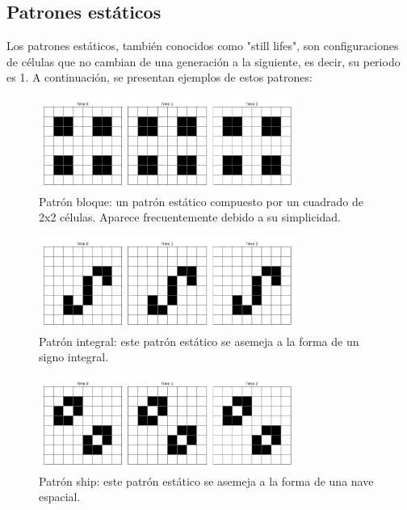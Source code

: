 \documentclass[]{article}
\begin{document}
\subsection{Patrones estáticos}
Los patrones estáticos, también conocidos como "still lifes", son configuraciones de células que no cambian de una generación a la siguiente, es decir, su periodo es 1. A continuación, se presentan ejemplos de estos patrones:

\begin{figure}[H]
  \centering
  \includegraphics[width=0.75\textwidth]{../assets/still_life/block/block.png}
  \caption{Patrón bloque: un patrón estático compuesto por un cuadrado de 2x2 células. Aparece frecuentemente debido a su simplicidad.}
  \label{fig:block}
  \end{figure}

\begin{figure}[H]
  \centering
  \includegraphics[width=0.75\textwidth]{../assets/still_life/integral/integral.png}
  \caption{Patrón integral: este patrón estático se asemeja a la forma de un signo integral.}
  \label{fig:integral}
  \end{figure}

\begin{figure}[H]
  \centering
  \includegraphics[width=0.75\textwidth]{../assets/still_life/ship/ship.png}
  \caption{Patrón ship: este patrón estático se asemeja a la forma de una nave espacial.}
  \label{fig:ship}
  \end{figure}
\end{document}
